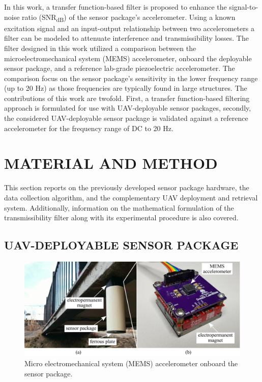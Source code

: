 \documentclass[]{spie}  %
\begin{document}
In this work, a transfer function-based filter is proposed to enhance the signal-to-noise ratio (SNR\textsubscript{dB}) of the sensor package’s accelerometer. Using a known excitation signal and an input-output relationship between two accelerometers a filter can be modeled to attenuate interference and transmissibility losses\cite{BADRI2010}. The filter designed in this work utilized a comparison between the microelectromechanical system (MEMS) accelerometer, onboard the deployable sensor package, and a reference lab-grade piezoelectric accelerometer. The comparison focus on the sensor package's sensitivity in the lower frequency range (up to 20 Hz) as those frequencies are typically found in large structures\cite{KARPEL1997}. The contributions of this work are twofold. First, a transfer function-based filtering approach is formulated for use with UAV-deployable sensor packages, secondly,  the considered UAV-deployable sensor package is validated against a reference accelerometer for the frequency range of DC to 20 Hz.


	
	
	\section{MATERIAL AND METHOD}

This section reports on the previously developed sensor package hardware, the data collection algorithm, and the complementary UAV deployment and retrieval system. Additionally, information on the mathematical formulation of the transmissibility filter along with its experimental procedure is also covered.

		\subsection{UAV-DEPLOYABLE SENSOR PACKAGE}

	\begin{figure} [H]
	\centering
	\includegraphics[width=6 in]{figures/MEMS.png}
	\caption{Micro electromechanical system (MEMS) accelerometer onboard the sensor package.}
	\label{fig:MEMS} 
	\end{figure} 	
	
\end{document}
